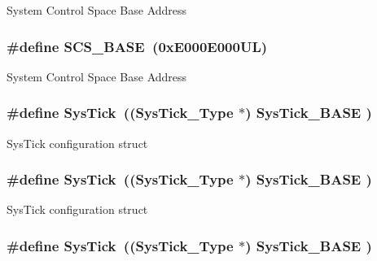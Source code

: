 System Control Space Base Address \hypertarget{group___c_m_s_i_s__core__base_ga3c14ed93192c8d9143322bbf77ebf770}{
\subsubsection[{S\-C\-S\-\_\-\-B\-A\-S\-E}]{\setlength{\rightskip}{0pt plus 5cm}\#define S\-C\-S\-\_\-\-B\-A\-S\-E~(0x\-E000\-E000\-U\-L)}}\label{group___c_m_s_i_s__core__base_ga3c14ed93192c8d9143322bbf77ebf770}
System Control Space Base Address \hypertarget{group___c_m_s_i_s__core__base_gacd96c53beeaff8f603fcda425eb295de}{
\subsubsection[{Sys\-Tick}]{\setlength{\rightskip}{0pt plus 5cm}\#define Sys\-Tick~(({\bf Sys\-Tick\-\_\-\-Type}   $\ast$)     {\bf Sys\-Tick\-\_\-\-B\-A\-S\-E}  )}}\label{group___c_m_s_i_s__core__base_gacd96c53beeaff8f603fcda425eb295de}
Sys\-Tick configuration struct \hypertarget{group___c_m_s_i_s__core__base_gacd96c53beeaff8f603fcda425eb295de}{
\subsubsection[{Sys\-Tick}]{\setlength{\rightskip}{0pt plus 5cm}\#define Sys\-Tick~(({\bf Sys\-Tick\-\_\-\-Type}   $\ast$)     {\bf Sys\-Tick\-\_\-\-B\-A\-S\-E}  )}}\label{group___c_m_s_i_s__core__base_gacd96c53beeaff8f603fcda425eb295de}
Sys\-Tick configuration struct \hypertarget{group___c_m_s_i_s__core__base_gacd96c53beeaff8f603fcda425eb295de}{
\subsubsection[{Sys\-Tick}]{\setlength{\rightskip}{0pt plus 5cm}\#define Sys\-Tick~(({\bf Sys\-Tick\-\_\-\-Type}   $\ast$)     {\bf Sys\-Tick\-\_\-\-B\-A\-S\-E}  )}}\label{group___c_m_s_i_s__core__base_gacd96c53beeaff8f603fcda425eb295de}
